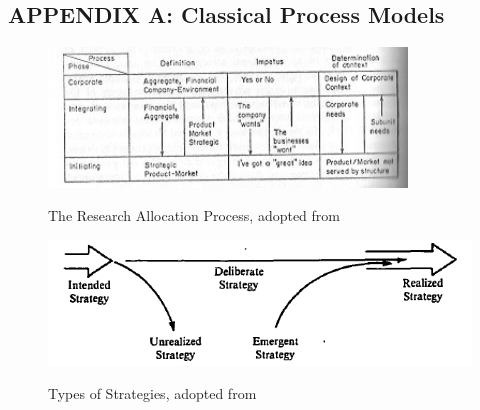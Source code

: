 \documentclass[12pt,letterpaper]{article}
\begin{document}
\begin{singlespace}
\renewcommand{\refname}{REFERENCES}
 

\end{singlespace}

\newpage
\appendix
\begin{singlespace}
\section{APPENDIX A: Classical Process Models}
\begin{figure}[h]
\begin{centering}
  \caption{The Research Allocation Process, adopted from \cite{Bower1970}}
  \includegraphics[width=0.85\textwidth]{Bower1970}
  \label{fig:Bower1970}
\end{centering}
\end{figure}

\begin{figure}[h]
\begin{centering}
  \caption{Types of Strategies, adopted from \cite{Mintzberg1978}}
  \includegraphics[width=\textwidth]{Mintzberg1978}
  \label{fig:Mintzberg1978}
\end{centering}
\end{figure}


\end{singlespace}
\end{document}
